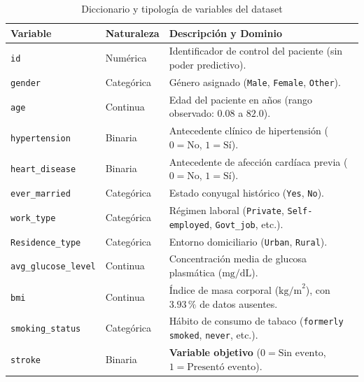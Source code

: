 \documentclass[12pt,a4paper]{article}
\begin{document}
\begin{table}[H]
\centering
\small
\caption{Diccionario y tipología de variables del dataset}
\label{tab:variables}
\begin{tabularx}{\textwidth}{@{}l l L@{}}
\toprule
\textbf{Variable} & \textbf{Naturaleza} & \textbf{Descripción y Dominio} \\
\midrule
\texttt{id} & Numérica & Identificador de control del paciente (sin poder predictivo). \\
\texttt{gender} & Categórica & Género asignado (\texttt{Male}, \texttt{Female}, \texttt{Other}). \\
\texttt{age} & Continua & Edad del paciente en años (rango observado: $0.08$ a $82.0$). \\
\texttt{hypertension} & Binaria & Antecedente clínico de hipertensión ($0 = \text{No}$, $1 = \text{Sí}$). \\
\texttt{heart\_disease} & Binaria & Antecedente de afección cardíaca previa ($0 = \text{No}$, $1 = \text{Sí}$). \\
\texttt{ever\_married} & Categórica & Estado conyugal histórico (\texttt{Yes}, \texttt{No}). \\
\texttt{work\_type} & Categórica & Régimen laboral (\texttt{Private}, \texttt{Self-employed}, \texttt{Govt\_job}, etc.). \\
\texttt{Residence\_type}& Categórica & Entorno domiciliario (\texttt{Urban}, \texttt{Rural}). \\
\texttt{avg\_glucose\_level} & Continua & Concentración media de glucosa plasmática ($\text{mg/dL}$). \\
\texttt{bmi} & Continua & Índice de masa corporal ($\text{kg/m}^2$), con $3.93\,\%$ de datos ausentes. \\
\texttt{smoking\_status}& Categórica & Hábito de consumo de tabaco (\texttt{formerly smoked}, \texttt{never}, etc.). \\
\texttt{stroke} & Binaria & \textbf{Variable objetivo} ($0 = \text{Sin evento}$, $1 = \text{Presentó evento}$). \\
\bottomrule
\end{tabularx}
\end{table}
\end{document}
